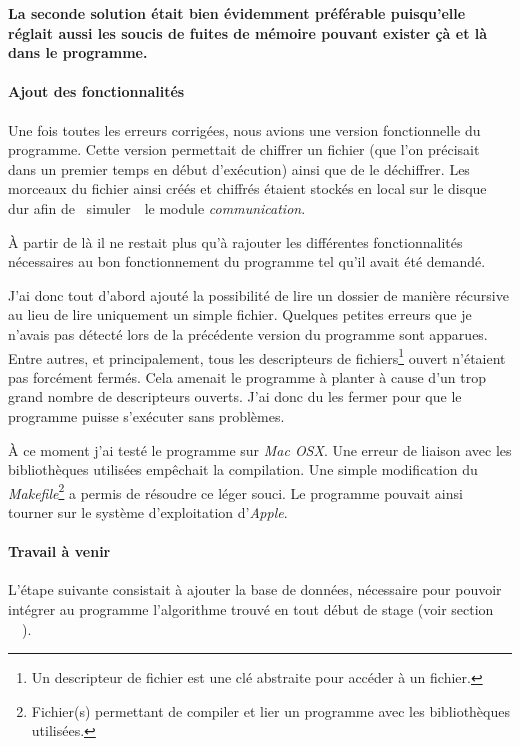 \documentclass[a4paper,10pt, twoside]{report}
\begin{document}
\begin{spacing}{1.2}
\textbf{La seconde solution était bien évidemment préférable puisqu'elle
réglait aussi les soucis de fuites de mémoire pouvant exister çà et là dans
le programme.}

\paragraph{Ajout des fonctionnalités}

\bigskip

Une fois toutes les erreurs corrigées, nous avions une version fonctionnelle du
programme. Cette version permettait de chiffrer un fichier (que l'on précisait
dans un premier temps en début d'exécution) ainsi que de le déchiffrer. Les
morceaux du fichier ainsi créés et chiffrés étaient stockés en local sur le
disque dur afin de \flqq~simuler~\frqq~le module \textit{communication}.

À partir de là il ne restait plus qu'à rajouter les différentes fonctionnalités
nécessaires au bon fonctionnement du programme tel qu'il avait été demandé.

J'ai donc tout d'abord ajouté la possibilité de lire un dossier de manière
récursive au lieu de lire uniquement un simple fichier. Quelques petites
erreurs que je n'avais pas détecté lors de la précédente version du programme
sont apparues. Entre autres, et principalement, tous les descripteurs de
fichiers\footnote{Un descripteur de fichier est une clé abstraite pour accéder
à un fichier.} ouvert n'étaient pas forcément fermés. Cela amenait le programme
à planter à cause d'un trop grand nombre de descripteurs ouverts. J'ai donc du
les fermer pour que le programme puisse s'exécuter sans problèmes.

À ce moment j'ai testé le programme sur \textit{Mac OSX}. Une erreur de liaison
avec les bibliothèques utilisées empêchait la compilation. Une simple
modification du \textit{Makefile}\footnote{Fichier(s) permettant de compiler
et lier un programme avec les bibliothèques utilisées.} a permis de résoudre
ce léger souci. Le programme pouvait ainsi tourner sur le système d'exploitation
d'\textit{Apple}.

\paragraph{Travail à venir}

\bigskip

L'étape suivante consistait à ajouter la base de données, nécessaire pour
pouvoir intégrer au programme l'algorithme trouvé en tout début de stage
(voir section \flqq~~\frqq).


\end{spacing}
\end{document}
